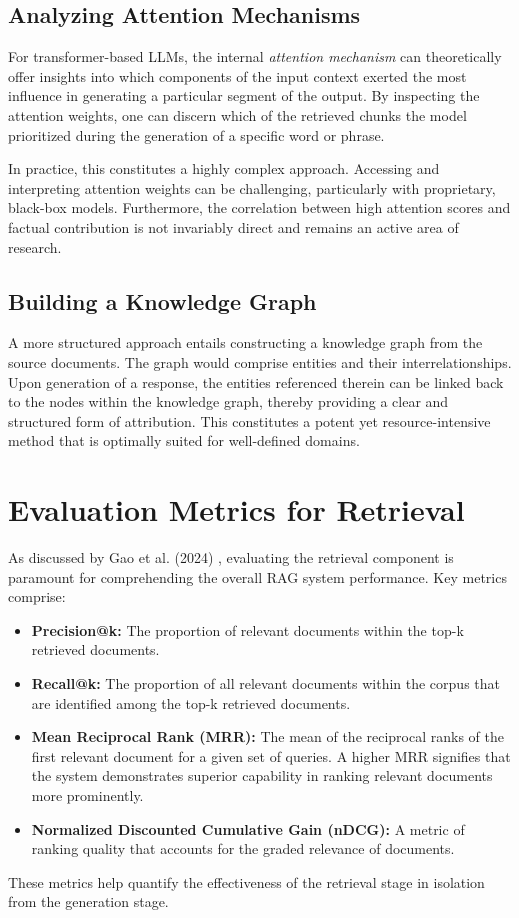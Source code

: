 \subsection{Analyzing Attention Mechanisms}
For transformer-based LLMs, the internal \textit{attention mechanism} can theoretically offer insights into which components of the input context exerted the most influence in generating a particular segment of the output. By inspecting the attention weights, one can discern which of the retrieved chunks the model prioritized during the generation of a specific word or phrase.

In practice, this constitutes a highly complex approach. Accessing and interpreting attention weights can be challenging, particularly with proprietary, black-box models. Furthermore, the correlation between high attention scores and factual contribution is not invariably direct and remains an active area of research.

\subsection{Building a Knowledge Graph}
A more structured approach entails constructing a knowledge graph from the source documents. The graph would comprise entities and their interrelationships. Upon generation of a response, the entities referenced therein can be linked back to the nodes within the knowledge graph, thereby providing a clear and structured form of attribution. This constitutes a potent yet resource-intensive method that is optimally suited for well-defined domains.

\section{Evaluation Metrics for Retrieval}
As discussed by Gao et al. (2024) \autocite{gao2024retrievalaugmented}, evaluating the retrieval component is paramount for comprehending the overall RAG system performance. Key metrics comprise:
\begin{itemize}
    \item \textbf{Precision@k:} The proportion of relevant documents within the top-k retrieved documents.
    \item \textbf{Recall@k:} The proportion of all relevant documents within the corpus that are identified among the top-k retrieved documents.
    \item \textbf{Mean Reciprocal Rank (MRR):} The mean of the reciprocal ranks of the first relevant document for a given set of queries. A higher MRR signifies that the system demonstrates superior capability in ranking relevant documents more prominently.
    \item \textbf{Normalized Discounted Cumulative Gain (nDCG):} A metric of ranking quality that accounts for the graded relevance of documents.
\end{itemize}
These metrics help quantify the effectiveness of the retrieval stage in isolation from the generation stage.